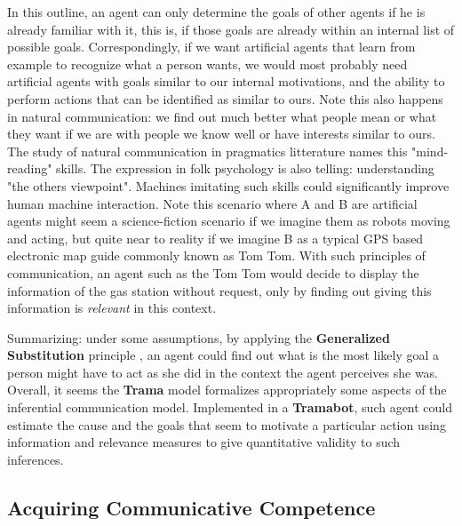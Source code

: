 \documentclass[
		twoside,openright,titlepage,numbers=noenddot,manychapters,
		headinclude,%
                footinclude=false,cleardoublepage=empty,
                BCOR=5mm,
		fontsize=11pt, %
                 enabledeprecatedfontcommands]{scrreprt}
\begin{document}
In this outline, an agent can only determine the goals of other agents if he is already familiar with it, this is, if those  goals are already within an internal list of possible goals. Correspondingly, if we want artificial agents that learn from example to recognize what a person wants, we would most probably need artificial agents with goals similar to our internal motivations, and the ability to perform actions that can be identified as similar to ours. Note this also happens in natural communication: we find out much better what people mean or what they want if we are with people we know well or have interests similar to ours. The study of natural communication in pragmatics litterature names this  "mind-reading" skills. The expression in folk psychology is also telling: understanding "the others viewpoint". Machines imitating such skills could significantly improve human machine interaction.
Note this scenario where A and B are artificial agents might seem a science-fiction scenario if we imagine them  as robots moving and acting, but quite near to reality if we imagine B as a typical GPS based electronic map guide commonly known as Tom Tom. With such principles of communication, an agent such as the Tom Tom would decide to display the information of the gas station without request, only by finding out giving this information is \emph{relevant} in this context. 

Summarizing: under some assumptions, by applying the \textbf{Generalized Substitution} principle , an agent could find out what is the most likely goal a person might have to act as she did in the context the agent perceives she was. Overall, it seems the \textbf{Trama} model formalizes appropriately some aspects of the inferential communication model. Implemented in a \textbf{Tramabot}, such agent could estimate the cause and the goals that seem to motivate a particular action using  information and relevance measures to give quantitative validity to such inferences. 





\subsection{Acquiring Communicative Competence}
\end{document}
